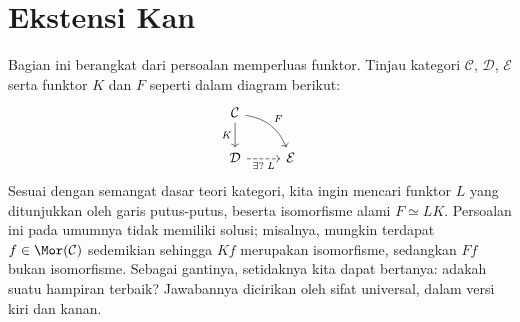 
\section{Ekstensi Kan}\label{sec:Kan-extension}
\hypertarget{o014.aljabr2.chapter1.kan-extensions}{ }

Bagian ini berangkat dari persoalan memperluas funktor. Tinjau kategori
$\mathcal{C}$, $\mathcal{D}$, $\mathcal{E}$ serta funktor $K$ dan $F$ seperti
dalam diagram berikut:
\[\begin{tikzcd}
	\mathcal{C} \arrow[d, "K"'] \arrow[rd, bend left, "F"] & \\
	\mathcal{D} \arrow[dashed, r, "{\exists ? \; L}"'] & \mathcal{E}
\end{tikzcd}\]
Sesuai dengan semangat dasar teori kategori, kita ingin mencari funktor $L$
yang ditunjukkan oleh garis putus-putus, beserta isomorfisme alami
$F \simeq LK$. Persoalan ini pada umumnya tidak memiliki solusi; misalnya,
mungkin terdapat $f \in \Mor(\mathcal{C})$ sedemikian sehingga $Kf$ merupakan
isomorfisme, sedangkan $Ff$ bukan isomorfisme. Sebagai gantinya, setidaknya
kita dapat bertanya: adakah suatu hampiran terbaik? Jawabannya dicirikan oleh
sifat universal, dalam versi kiri dan kanan.

